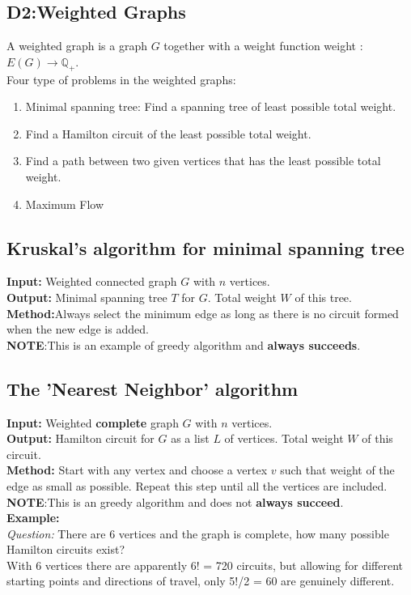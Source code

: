 \documentclass{article}
\begin{document}
\begin{spacing}{1.5}
\section{D2:Weighted Graphs}
A weighted graph is a graph $G$ together with a weight function weight : $E(G) \rightarrow \mathbb{Q}_+ $. \\
Four type of problems in the weighted graphs:
\begin{enumerate}
    \item Minimal spanning tree:
    Find a spanning tree of least possible total weight.
    \item Find a Hamilton circuit of the least possible total weight.
    \item Find a path between two given vertices that has the least possible total weight.
    \item Maximum Flow 
\end{enumerate}
\subsection{Kruskal's algorithm for minimal spanning tree}
\textbf{Input:} Weighted connected graph $G$ with $n$ vertices.\\
\textbf{Output:} Minimal spanning tree $T$ for $G$. Total weight $W$ of this tree. \\
\textbf{Method:}Always select the minimum edge as long as there is no circuit formed when the new edge is added.\\ 
\textbf{NOTE}:This is an example of greedy algorithm and \textbf{always succeeds}. 

\subsection{The 'Nearest Neighbor' algorithm}
\textbf{Input:} Weighted \textbf{complete} graph $G$ with $n$ vertices.\\
\textbf{Output:} Hamilton circuit for $G$ as a list $L$ of vertices. Total weight $W$ of this circuit. \\
\textbf{Method:} Start with any vertex and choose a vertex $v$ such that weight of the edge as small as possible. Repeat this step until all the vertices are included.\\
\textbf{NOTE}:This is an greedy algorithm and does not \textbf{always succeed}. \\
\textbf{Example:}\\
\textit{Question: }There are 6 vertices and the graph is complete, how many possible Hamilton circuits exist?\\
With 6 vertices there are apparently 6! = 720 circuits, but allowing for different starting points and directions of travel, only 5!/2 = 60 are genuinely different.



\end{spacing}
\end{document}
